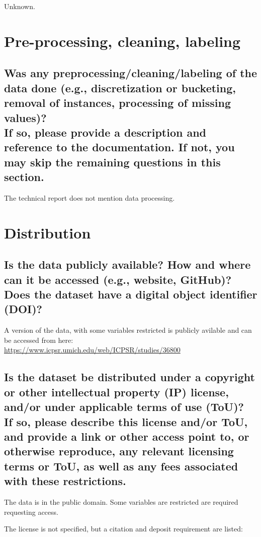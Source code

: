 \documentclass[letterpaper, 10 pt, conference]{ieeeconf}  %
\newcommand{\subtitle}[1]{{\\ \small \normalfont \color{purple} #1}}
\begin{document}
Unknown.

\section{Pre-processing, cleaning, labeling}

\subsection{Was any preprocessing/cleaning/labeling of the data done (e.g., discretization or bucketing, removal of instances, processing of missing values)? \subtitle{If so, please provide a description and reference to the documentation. If not, you may skip the remaining questions in this section.}}

The technical report \cite{pathways_report} does not mention data processing. 


\section{Distribution}
\subsection{Is the data publicly available? How and where can it be accessed (e.g., website, GitHub)? \subtitle{Does the dataset have a digital object identifier (DOI)?}}

A version of the data, with some variables restricted is publicly avilable and can be accessed from here: \\

\href{https://www.icpsr.umich.edu/web/ICPSR/studies/36800}{https://www.icpsr.umich.edu/web/ICPSR/studies/36800}

\subsection{Is the dataset be distributed under a copyright or other intellectual property (IP) license, and/or under applicable terms of use (ToU)? \subtitle{If so, please describe this license and/or ToU, and provide a link or other access point to, or otherwise reproduce, any relevant licensing terms or ToU, as well as any fees associated with these restrictions.}}

The data is in the public domain. Some variables are restricted are required requesting access. 

The license is not specified, but a citation and deposit requirement are listed:
\end{document}

